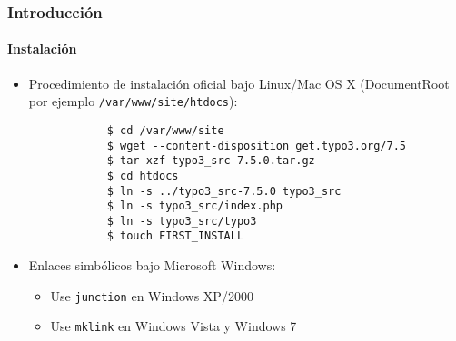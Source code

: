 \begin{frame}[fragile]
	\frametitle{Introducción}
	\framesubtitle{Instalación}

	\begin{itemize}
		\item Procedimiento de instalación oficial bajo Linux/Mac OS X\newline
			(DocumentRoot por ejemplo \texttt{/var/www/site/htdocs}):
		\begin{lstlisting}
			$ cd /var/www/site
			$ wget --content-disposition get.typo3.org/7.5
			$ tar xzf typo3_src-7.5.0.tar.gz
			$ cd htdocs
			$ ln -s ../typo3_src-7.5.0 typo3_src
			$ ln -s typo3_src/index.php
			$ ln -s typo3_src/typo3
			$ touch FIRST_INSTALL
		\end{lstlisting}

		\item Enlaces simbólicos bajo Microsoft Windows:

			\begin{itemize}
				\item Use \texttt{junction} en Windows XP/2000
				\item Use \texttt{mklink} en Windows Vista y Windows 7
			\end{itemize}

	\end{itemize}
\end{frame}

